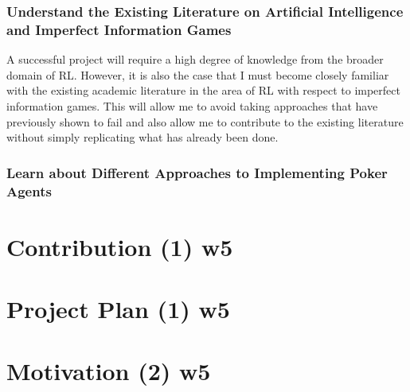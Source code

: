 \subsubsection{Understand the Existing Literature on Artificial Intelligence and Imperfect Information Games}
A successful project will require a high degree of knowledge from the broader domain of RL. However, it is also the case
that I must become closely familiar with the existing academic literature in the area of RL with respect to imperfect
information games.
This will allow me to avoid taking approaches that have previously shown to fail and also allow me to contribute to
the existing literature without simply replicating what has already been done.

\subsubsection{Learn about Different Approaches to Implementing Poker Agents}


\section{Contribution (1) w5}\label{sec:contribution}


\section{Project Plan (1) w5}\label{sec:projectPlan}


\section{Motivation (2) w5}\label{sec:Motivation}